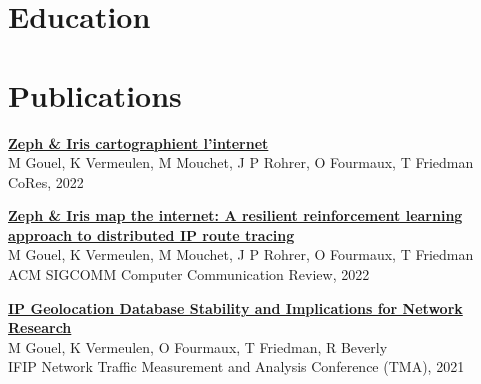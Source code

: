 \documentclass[11pt,a4paper,sans]{moderncv} %
\begin{document}

\newpage
\section{Education}



\section{Publications}

\href{https://hal.archives-ouvertes.fr/hal-03656974/document}{\textbf{Zeph \& Iris cartographient l’internet}}\\
M Gouel, K Vermeulen, M Mouchet, J P Rohrer, O Fourmaux, T Friedman\\
CoRes, 2022

\vspace{0.25cm}
\href{https://hal.archives-ouvertes.fr/hal-03597580/document}{\textbf{Zeph \& Iris map the internet: A resilient reinforcement learning approach to distributed IP route tracing}}\\
M Gouel, K Vermeulen, M Mouchet, J P Rohrer, O Fourmaux, T Friedman\\
ACM SIGCOMM Computer Communication Review, 2022

\vspace{0.25cm}
\href{https://dl.ifip.org/db/conf/tma/tma2021/tma2021-paper2.pdf}{\textbf{IP Geolocation Database Stability and Implications for Network Research}}\\
M Gouel, K Vermeulen, O Fourmaux, T Friedman, R Beverly\\
IFIP Network Traffic Measurement and Analysis Conference (TMA), 2021
\end{document}
